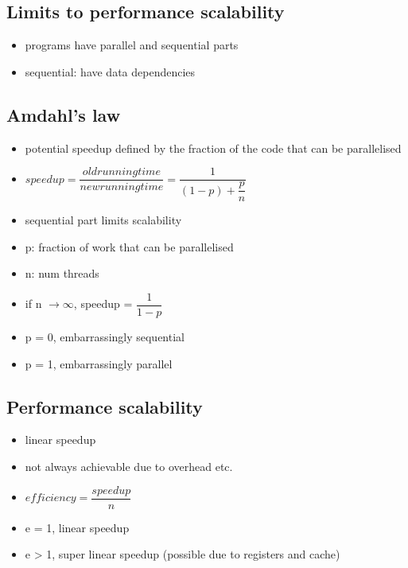 \documentclass[10pt, multicolumn, a4paper]{article}
\begin{document}
\begin{multicols}{2}
	\subsection*{Limits to performance scalability}
	\begin{itemize}
	\item programs have parallel and sequential parts
	\item sequential: have data dependencies
	\end{itemize}
	\subsection*{Amdahl's law}
	\begin{itemize}
	\item potential speedup defined by the fraction of the code that can be parallelised
	\item $speedup = \dfrac{old running time}{new running time} 
		= \dfrac{1}{(1-p) + \dfrac{p}{n}}$
	\item sequential part limits scalability
	\item p: fraction of work that can be parallelised
	\item n: num threads
	\item if n $\rightarrow \infty$, speedup = $\dfrac{1}{1-p}$
	\item p = 0, embarrassingly sequential
	\item p = 1, embarrassingly parallel
	\end{itemize}
	\subsection*{Performance scalability}
	\begin{itemize}
	\item linear speedup
	\item not always achievable due to overhead etc.
	\item $efficiency = \dfrac{speedup}{n}$
	\item e = 1, linear speedup
	\item e > 1, super linear speedup (possible due to registers and cache)
	\end{itemize}

\end{multicols}
\end{document}

